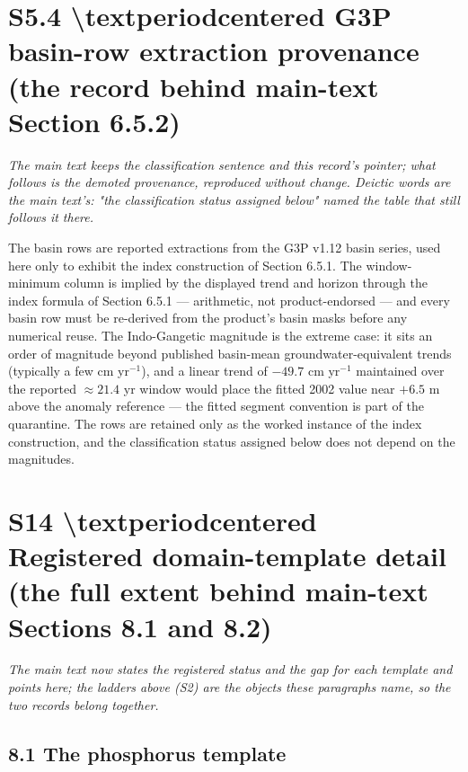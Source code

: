 \documentclass[11pt]{article}
\begin{document}
\section*{S5.4 \textbackslash{}textperiodcentered{} G3P basin-row extraction provenance (the record behind main-text Section 6.5.2)}\label{s54-textperiodcentered{}-g3p-basin-row-extraction-provenance-the-recor}

\emph{The main text keeps the classification sentence and this record's pointer; what follows is the demoted provenance, reproduced without change. Deictic words are the main text's: "the classification status assigned below" named the table that still follows it there.}

The basin rows are reported extractions from the G3P v1.12 basin series, used here only to exhibit the index construction of Section 6.5.1. The window-minimum column is implied by the displayed trend and horizon through the index formula of Section 6.5.1 --- arithmetic, not product-endorsed --- and every basin row must be re-derived from the product's basin masks before any numerical reuse. The Indo-Gangetic magnitude is the extreme case: it sits an order of magnitude beyond published basin-mean groundwater-equivalent trends (typically a few cm yr\(^{-1}\)), and a linear trend of \(-49.7\) cm yr\(^{-1}\) maintained over the reported \(\approx 21.4\) yr window would place the fitted 2002 value near \(+6.5\) m above the anomaly reference --- the fitted segment convention is part of the quarantine. The rows are retained only as the worked instance of the index construction, and the classification status assigned below does not depend on the magnitudes.

\section*{S14 \textbackslash{}textperiodcentered{} Registered domain-template detail (the full extent behind main-text Sections 8.1 and 8.2)}\label{s14-textperiodcentered{}-registered-domain-template-detail-the-full-ex}

\emph{The main text now states the registered status and the gap for each template and points here; the ladders above (S2) are the objects these paragraphs name, so the two records belong together.}

\subsection*{8.1 The phosphorus template}\label{81-the-phosphorus-template}
\end{document}
